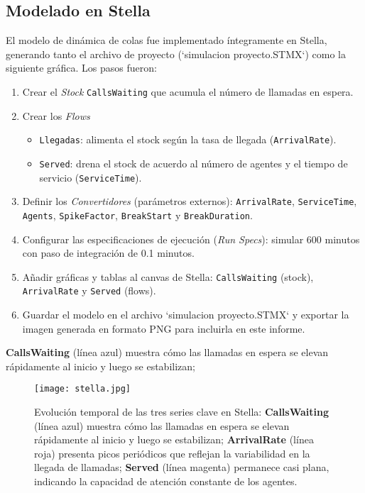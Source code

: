 \documentclass[12pt]{article}
\begin{document}
\subsection{Modelado en Stella}
El modelo de dinámica de colas fue implementado íntegramente en Stella, generando tanto el archivo de proyecto (`simulacion proyecto.STMX`) como la siguiente gráfica. Los pasos fueron:

\begin{enumerate}
  \item Crear el \emph{Stock} \texttt{CallsWaiting} que acumula el número de llamadas en espera.
  \item Crear los \emph{Flows}  
    \begin{itemize}
      \item \texttt{Llegadas}: alimenta el stock según la tasa de llegada (\texttt{ArrivalRate}).  
      \item \texttt{Served}: drena el stock de acuerdo al número de agentes y el tiempo de servicio (\texttt{ServiceTime}).
    \end{itemize}
  \item Definir los \emph{Convertidores} (parámetros externos):  
    \texttt{ArrivalRate}, \texttt{ServiceTime}, \texttt{Agents}, \texttt{SpikeFactor}, \texttt{BreakStart} y \texttt{BreakDuration}.
  \item Configurar las especificaciones de ejecución (\emph{Run Specs}):  
    simular 600 minutos con paso de integración de 0.1 minutos.
  \item Añadir gráficas y tablas al canvas de Stella:  
    \texttt{CallsWaiting} (stock), \texttt{ArrivalRate} y \texttt{Served} (flows).  
  \item Guardar el modelo en el archivo `simulacion proyecto.STMX` y exportar la imagen generada en formato PNG para incluirla en este informe.
\end{enumerate}
    \textbf{CallsWaiting} (línea azul) muestra cómo las llamadas en espera se elevan rápidamente al inicio y luego se estabilizan; 


\begin{figure}[H]
  \centering
  \texttt{[image: stella.jpg]}
  \caption{Evolución temporal de las tres series clave en Stella: 
    \textbf{CallsWaiting} (línea azul) muestra cómo las llamadas en espera se elevan rápidamente al inicio y luego se estabilizan; 
    \textbf{ArrivalRate} (línea roja) presenta picos periódicos que reflejan la variabilidad en la llegada de llamadas; 
    \textbf{Served} (línea magenta) permanece casi plana, indicando la capacidad de atención constante de los agentes.}
  \label{fig:modelo_stella}
\end{figure}
\end{document}
